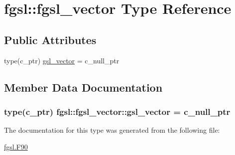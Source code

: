 \hypertarget{structfgsl_1_1fgsl__vector}{\section{fgsl\-:\-:fgsl\-\_\-vector Type Reference}
\label{structfgsl_1_1fgsl__vector}
}
\subsection*{Public Attributes}
\begin{DoxyCompactItemize}
\item 
type(c\-\_\-ptr) \hyperlink{structfgsl_1_1fgsl__vector_abc58a30c78d6edb636f482c148a03b2b}{gsl\-\_\-vector} = c\-\_\-null\-\_\-ptr
\end{DoxyCompactItemize}


\subsection{Member Data Documentation}
\hypertarget{structfgsl_1_1fgsl__vector_abc58a30c78d6edb636f482c148a03b2b}{
\subsubsection[{gsl\-\_\-vector}]{\setlength{\rightskip}{0pt plus 5cm}type(c\-\_\-ptr) fgsl\-::fgsl\-\_\-vector\-::gsl\-\_\-vector = c\-\_\-null\-\_\-ptr}}\label{structfgsl_1_1fgsl__vector_abc58a30c78d6edb636f482c148a03b2b}


The documentation for this type was generated from the following file\-:\begin{DoxyCompactItemize}
\item 
\hyperlink{fgsl_8F90}{fgsl.\-F90}\end{DoxyCompactItemize}
